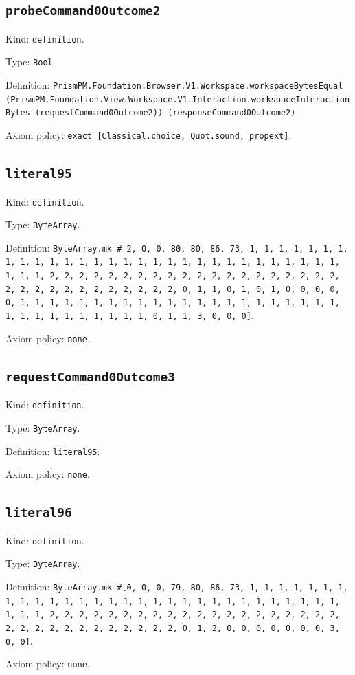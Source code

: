 \documentclass[11pt]{article}
\begin{document}
\subsection*{\texttt{probeCommand0Outcome2}}
\noindent Kind: \texttt{definition}.\par
\noindent Type: \texttt{Bool}.\par
\noindent Definition: \texttt{PrismPM.Foundation.Browser.V1.Workspace.workspaceBytesEqual (PrismPM.Foundation.View.Workspace.V1.Interaction.workspaceInteractionBytes (requestCommand0Outcome2)) (responseCommand0Outcome2)}.\par
\noindent Axiom policy: \texttt{exact [Classical.choice, Quot.sound, propext]}.\par
\subsection*{\texttt{literal95}}
\noindent Kind: \texttt{definition}.\par
\noindent Type: \texttt{ByteArray}.\par
\noindent Definition: \texttt{ByteArray.mk \#[2, 0, 0, 80, 80, 86, 73, 1, 1, 1, 1, 1, 1, 1, 1, 1, 1, 1, 1, 1, 1, 1, 1, 1, 1, 1, 1, 1, 1, 1, 1, 1, 1, 1, 1, 1, 1, 1, 1, 1, 2, 2, 2, 2, 2, 2, 2, 2, 2, 2, 2, 2, 2, 2, 2, 2, 2, 2, 2, 2, 2, 2, 2, 2, 2, 2, 2, 2, 2, 2, 2, 2, 0, 1, 1, 0, 1, 0, 1, 0, 0, 0, 0, 0, 1, 1, 1, 1, 1, 1, 1, 1, 1, 1, 1, 1, 1, 1, 1, 1, 1, 1, 1, 1, 1, 1, 1, 1, 1, 1, 1, 1, 1, 1, 1, 1, 0, 1, 1, 3, 0, 0, 0]}.\par
\noindent Axiom policy: \texttt{none}.\par
\subsection*{\texttt{requestCommand0Outcome3}}
\noindent Kind: \texttt{definition}.\par
\noindent Type: \texttt{ByteArray}.\par
\noindent Definition: \texttt{literal95}.\par
\noindent Axiom policy: \texttt{none}.\par
\subsection*{\texttt{literal96}}
\noindent Kind: \texttt{definition}.\par
\noindent Type: \texttt{ByteArray}.\par
\noindent Definition: \texttt{ByteArray.mk \#[0, 0, 0, 79, 80, 86, 73, 1, 1, 1, 1, 1, 1, 1, 1, 1, 1, 1, 1, 1, 1, 1, 1, 1, 1, 1, 1, 1, 1, 1, 1, 1, 1, 1, 1, 1, 1, 1, 1, 1, 2, 2, 2, 2, 2, 2, 2, 2, 2, 2, 2, 2, 2, 2, 2, 2, 2, 2, 2, 2, 2, 2, 2, 2, 2, 2, 2, 2, 2, 2, 2, 2, 0, 1, 2, 0, 0, 0, 0, 0, 0, 0, 3, 0, 0]}.\par
\noindent Axiom policy: \texttt{none}.\par
\end{document}
